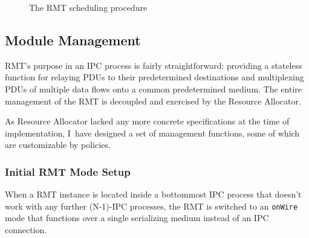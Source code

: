             \begin{figure}[H]
                \begin{center}
                  \caption{The RMT scheduling procedure}
                  \label{fig:sched-petri}
                \end{center}
            \end{figure}

        \subsection{Module Management}\label{implementation:mgmt}

            RMT's purpose in an IPC process is fairly straightforward: providing a stateless function for relaying PDUs to their predetermined destinations and multiplexing PDUs of multiple data flows onto a common predetermined medium. The entire management of the RMT is decoupled and exercised by the Resource Allocator.

            As Resource Allocator lacked any more concrete specifications at the time of implementation, I~have designed a set of management functions, some of which are customizable by policies.

            \subsubsection{Initial RMT Mode Setup}

                When a RMT instance is located inside a bottommost IPC process that doesn't work with any further (N-1)-IPC processes, the RMT is switched to an \texttt{onWire} mode that functions over a single serializing medium instead of an IPC connection.

